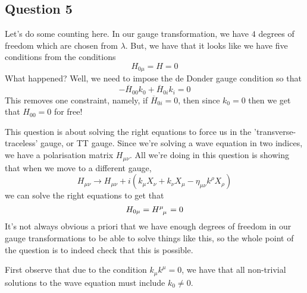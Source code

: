 \subsection{Question 5}
Let's do some counting here. 
In our gauge transformation, 
we have $ 4 $ degrees of freedom which 
are chosen from $ \lambda $. 
But, we have that it looks like we 
have five conditions from 
the conditions 
\[
 H _{ 0 \mu }  = H  = 0 
\] What happened? 
Well, we need to impose the de Donder gauge
condition so that 
\[
  - \overline{ H } _{ 00 } k _ 0 + \overline{ H } _{ 0i  } k _ i  = 0
\] This removes one constraint, namely, 
if $ \overline{ H  }_{ 0i } = 0 $, then since $ k _ 0  = 0 $  
then we get that $ H _{ 00}  =  0 $ for free! 

This question is about solving the right 
equations to force us in the 'transverse-traceless' 
gauge, or TT gauge. Since we're solving 
a wave equation in two indices, we have a 
polarisation matrix $ H _{ \mu \nu } $. 
All we're doing in this question is showing that 
when we move to a different gauge, 
\[
	H_{ \mu \nu } \to H _{ \mu \nu }  + i \left( 
	k _ \mu X _ \nu + k _ \nu X _ \mu  - \eta _{ \mu \nu  } k ^ \rho X _ \rho \right) 
\] we can solve the right equations to get that 
\[
 H _{ 0 \mu }  = H \indices{^ \mu _ \mu }  =0  
\] It's not 
always obvious a priori that we have enough 
degrees of freedom in our gauge transformations 
to be able to solve things like this, so 
the whole point of the question is to indeed 
check that this is possible.

First observe that due to the 
condition $ k _ \mu k ^ \mu  = 0 $, 
we have that all non-trivial solutions 
to the wave equation must include 
 $ k _ 0 \neq  0 $.

